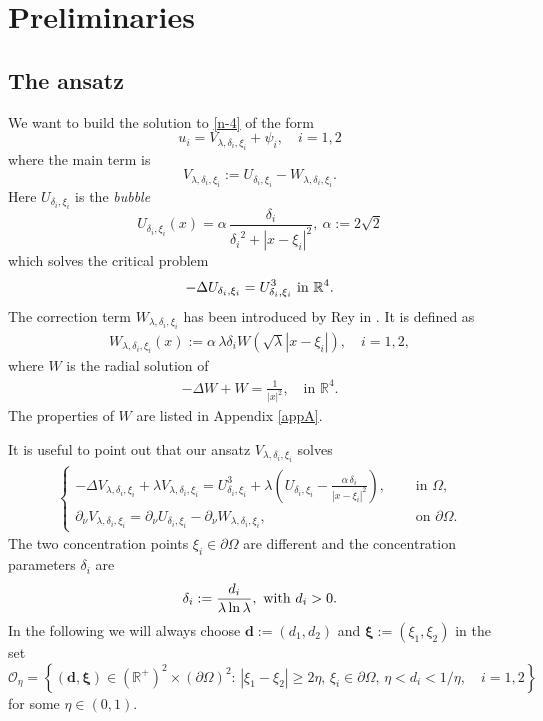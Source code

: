 \documentclass[a4paper,reqno,11pt,oneside]{amsart}
\numberwithin{equation}{section}
\newcommand{\R}{\mathbb{R}}
\begin{document}
\section{Preliminaries}\label{two}
\subsection{The ansatz}


We want to build  the solution to \eqref{n-4} of the form $$u_i= V_{\lambda,\delta_i,\xi_i}+\psi_i,\quad i=1,2$$ 
 where the main term is $$V_{\lambda,\delta_i,\xi_i}:=U_{\delta_i,\xi_i}-W_{\lambda,\delta_i,\xi_i}.
$$
Here $U_{\delta_i,\xi_i}$ is the {\em bubble}
$$
       U_{ {\delta_i}, {\xi_i}}(x)=\alpha\,\frac{{ {\delta_i}}}{ {\delta_i}^2+\left|x- {\xi_i}\right|^2},\ \alpha:=2\sqrt2$$
       which solves the critical problem
       $$-\Delta U_{  {\delta_i}, {\xi_i}}= U_{ {\delta_i},{\xi_i}}^{3}\ \hbox{in}\ \mathbb R^4.
$$
The correction term $W_{\lambda,\delta_i,\xi_i}$ has been introduced by Rey in \cite{1999-REY}. It is defined as
\begin{align}\label{w-delta}
    W_{\lambda,\delta_i,\xi_i}(x):=\alpha\,\lambda\delta_i W\left(\sqrt{\lambda}|x-\xi_i|\right),\quad \text{$i=1,2,$}
\end{align}
where $W$ is the radial  solution of
\begin{align*}
   -\Delta W+W=\frac{1}{|x|^{2}},\quad\text{in $\R^4$.}
\end{align*}  
The properties of $W$ are listed in Appendix \ref{appA}. 

\medskip
It is useful to point out that our ansatz  $V_{\lambda,\delta_i,\xi_i}$ solves
\begin{align}
\begin{cases}
    \label{a-d}-\Delta V_{\lambda,\delta_i,\xi_i}+\lambda V_{\lambda,\delta_i,\xi_i}=U^{3}_{ {\delta_i}, {\xi_i}}+\lambda\left(U_{ {\delta_i}, {\xi_i}}-\frac{\alpha\,\delta_i}{|x-\xi_i|^{2}}\right),\quad &\text{ in $\Omega$,}\\
\partial_{\nu}V_{\lambda,\delta_i,\xi_i}=\partial_{\nu} U_{ {\delta_i}, {\xi_i}}-\partial_{\nu}W_{\lambda,\delta_i,\xi_i},&\text{ on $\partial\Omega$.}
\end{cases}
\end{align} 
The two concentration points $\xi_i\in\partial\Omega$ are different and the concentration parameters $\delta_i$ are 
\begin{equation*}
\delta_i:=\frac{d_i}{\lambda\ln\lambda},\ \hbox{with}\ d_i>0.
\end{equation*}
In the following we will always choose
$ \bm{d}:=(d_1,d_2)$ and $\bm{\xi}:=(\xi_1,\xi_2)$ in the set
$$\mathcal{O}_\eta= \left\{\left(\bm{d}, \bm{\xi}\right) \in\left(\mathbb{R}^{+}\right)^2 \times (\partial\Omega)^2:\,\left|\xi_{1}-\xi_{2}\right|\geq 2\eta,\,\xi_i\in\partial\Omega,\,\eta<d_i<1 / \eta,\quad i=1,2\right\} $$
for some $\eta\in(0,1).$\\
\end{document}

